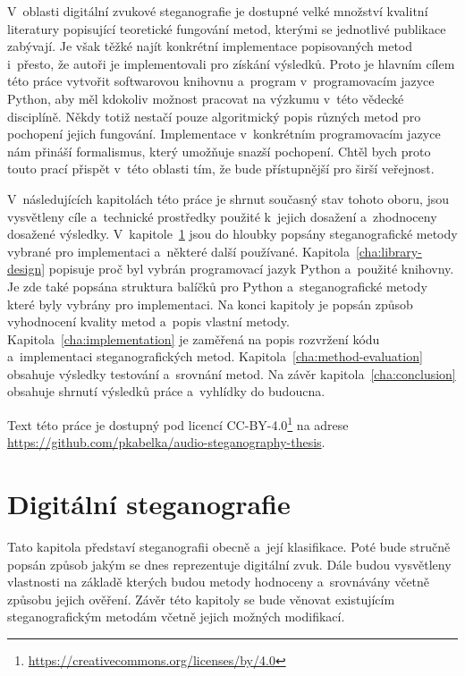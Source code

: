 V~oblasti digitální zvukové steganografie je dostupné velké množství kvalitní
literatury popisující teoretické fungování metod, kterými se jednotlivé
publikace zabývají. Je však těžké najít konkrétní implementace popisovaných
metod i~přesto, že autoři je implementovali pro získání výsledků. Proto je
hlavním cílem této práce vytvořit softwarovou knihovnu a~program
v~programovacím jazyce Python, aby měl kdokoliv možnost pracovat na výzkumu
v~této vědecké disciplíně. Někdy totiž nestačí pouze algoritmický popis různých
metod pro pochopení jejich fungování. Implementace v~konkrétním programovacím
jazyce nám přináší formalismus, který umožňuje snazší pochopení. Chtěl bych
proto touto prací přispět v~této oblasti tím, že bude přístupnější pro širší
veřejnost.

V~následujících kapitolách této práce je shrnut současný stav tohoto oboru,
jsou vysvětleny cíle a~technické prostředky použité k~jejich dosažení
a~zhodnoceny dosažené výsledky. V~kapitole~\ref{cha:digital-steganography} jsou
do hloubky popsány steganografické metody vybrané pro implementaci a~některé
další používané. Kapitola~\ref{cha:library-design} popisuje proč byl vybrán
programovací jazyk Python a~použité knihovny. Je zde také popsána struktura
balíčků pro Python a~steganografické metody které byly vybrány pro
implementaci. Na konci kapitoly je popsán způsob vyhodnocení kvality metod
a~popis vlastní metody. Kapitola~\ref{cha:implementation} je zaměřená na popis
rozvržení kódu a~implementaci steganografických metod.
Kapitola~\ref{cha:method-evaluation} obsahuje výsledky testování a~srovnání
metod. Na závěr kapitola~\ref{cha:conclusion} obsahuje shrnutí výsledků práce
a~vyhlídky do budoucna.

Text této práce je dostupný pod licencí
CC-BY-4.0\footnote{\url{https://creativecommons.org/licenses/by/4.0}} na adrese
\url{https://github.com/pkabelka/audio-steganography-thesis}.


\chapter{Digitální steganografie}
\label{cha:digital-steganography}

Tato kapitola představí steganografii obecně a~její klasifikace. Poté bude
stručně popsán způsob jakým se dnes reprezentuje digitální zvuk. Dále budou
vysvětleny vlastnosti na základě kterých budou metody hodnoceny a~srovnávány
včetně způsobu jejich ověření. Závěr této kapitoly se bude věnovat existujícím
steganografickým metodám včetně jejich možných modifikací.

